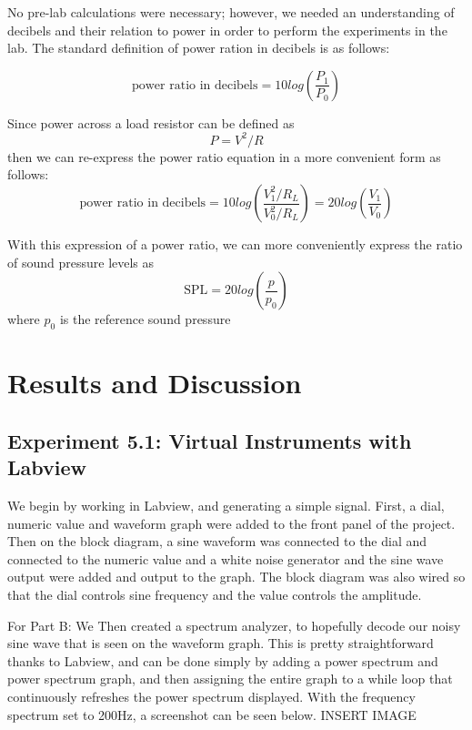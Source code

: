 \documentclass[10pt]{article}
\begin{document}
No pre-lab calculations were necessary; however, we needed an understanding of decibels and their relation to power in order to perform the experiments in the lab. The standard definition of power ration in decibels is as follows:

$$ \text{power ratio in decibels} = 10log(\frac{P_1}{P_0})$$

Since power across a load resistor can be defined as $$P = V^2/R$$then we can re-express the power ratio equation in a more convenient form as follows: $$\text{power ratio in decibels} = 10log(\frac{V_1^2/R_L}{V_0^2/R_L}) = 20log(\frac{V_1}{V_0})$$

With this expression of a power ratio, we can more conveniently express the ratio of sound pressure levels as $$\text{SPL} = 20log(\frac{p}{p_0})$$ where $p_0$ is the reference sound pressure 

\medskip


\section{Results and Discussion}

\subsection{Experiment 5.1: Virtual Instruments with Labview }
\qquad We begin by working in Labview, and generating a simple signal. First, a dial, numeric value and waveform graph were added to the front panel of the project. Then on the block diagram, a sine waveform was connected to the dial and connected to the numeric value and a white noise generator and the sine wave output were added and output to the graph. The block diagram was also wired so that the dial controls sine frequency and the value controls the amplitude. 

For Part B: We Then created a spectrum analyzer, to hopefully decode our noisy sine wave that is seen on the waveform graph. This is pretty straightforward thanks to Labview, and can be done simply by adding a power spectrum and power spectrum graph, and then assigning the entire graph to a while loop that continuously refreshes the power spectrum displayed. With the frequency spectrum set to 200Hz, a screenshot can be seen below.
INSERT IMAGE
\end{document}
